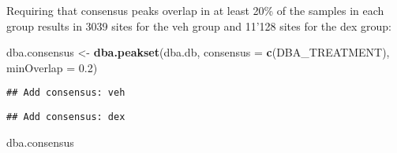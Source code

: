 \documentclass[
]{article}
\newenvironment{Shaded}{\begin{snugshade}}{\end{snugshade}}
\newcommand{\DataTypeTok}[1]{\textcolor[rgb]{0.13,0.29,0.53}{#1}}
\newcommand{\FloatTok}[1]{\textcolor[rgb]{0.00,0.00,0.81}{#1}}
\newcommand{\KeywordTok}[1]{\textcolor[rgb]{0.13,0.29,0.53}{\textbf{#1}}}
\newcommand{\NormalTok}[1]{#1}
\newcommand{\StringTok}[1]{\textcolor[rgb]{0.31,0.60,0.02}{#1}}
\begin{document}
Requiring that consensus peaks overlap in at least 20\% of the samples
in each group results in 3039 sites for the veh group and 11'128 sites
for the dex group:

\begin{Shaded}
\begin{Highlighting}[]
\NormalTok{dba.consensus <-}\StringTok{ }\KeywordTok{dba.peakset}\NormalTok{(dba.db, }\DataTypeTok{consensus =} \KeywordTok{c}\NormalTok{(DBA_TREATMENT), }\DataTypeTok{minOverlap =} \FloatTok{0.2}\NormalTok{)}
\end{Highlighting}
\end{Shaded}

\begin{verbatim}
## Add consensus: veh
\end{verbatim}

\begin{verbatim}
## Add consensus: dex
\end{verbatim}

\begin{Shaded}
\begin{Highlighting}[]
\NormalTok{dba.consensus}
\end{Highlighting}
\end{Shaded}
\end{document}
